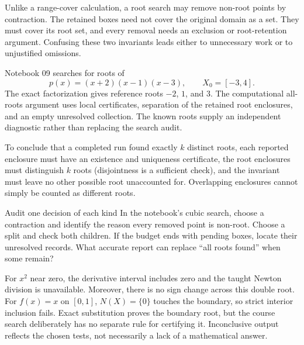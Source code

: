 Unlike a range-cover calculation, a root search may remove non-root points
by contraction. The retained boxes need not cover the original domain as a
set. They must cover its root set, and every removal needs an exclusion or
root-retention argument. Confusing these two invariants leads either to
unnecessary work or to unjustified omissions.

Notebook 09 searches for roots of
\[
                   p(x)=(x+2)(x-1)(x-3),\qquad X_0=[-3,4].
\]
The exact factorization gives reference roots $-2$, $1$, and $3$. The
computational all-roots argument uses local certificates, separation of the
retained root enclosures, and an empty unresolved collection. The known
roots supply an independent diagnostic rather than replacing the search audit.

To conclude that a completed run found exactly $k$ distinct roots, each
reported enclosure must have an existence and uniqueness certificate, the
root enclosures must distinguish $k$ roots (disjointness is a sufficient
check), and the invariant must leave no other possible root unaccounted for.
Overlapping enclosures cannot simply be counted as different roots.

\begin{question}{Audit one decision of each kind}
In the notebook's cubic search, choose a contraction and identify the reason
every removed point is non-root. Choose a split and check both children.
If the budget ends with pending boxes, locate their unresolved records.
What accurate report can replace ``all roots found'' when some remain?
\end{question}

\newpage
{}
For $x^2$ near zero, the derivative interval includes zero and the taught
Newton division is unavailable. Moreover, there is no sign change across
this double root. For $f(x)=x$ on $[0,1]$, $N(X)=\{0\}$ touches the
boundary, so strict interior inclusion fails. Exact substitution proves the
boundary root, but the course search deliberately has no separate rule for
certifying it. Inconclusive output reflects the chosen tests, not necessarily
a lack of a mathematical answer.

